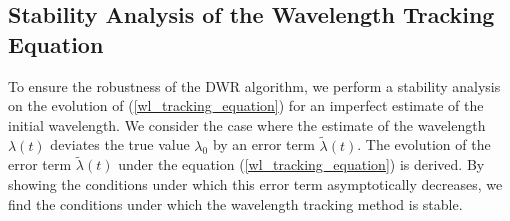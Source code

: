 \documentclass[12pt]{report}
\begin{document}
	
	\subsection{Stability Analysis of the Wavelength Tracking Equation}
	To ensure the robustness of the DWR algorithm, we perform a stability analysis on the evolution of (\ref{wl_tracking_equation}) for an imperfect estimate of the initial wavelength. We consider the case where the estimate of the wavelength $\lambda(t)$ deviates the true value $\lambda_0$ by an error term $\tilde{\lambda}(t)$. The evolution of the error term $\tilde{\lambda}(t)$ under the equation (\ref{wl_tracking_equation}) is derived. By showing the conditions under which this error term asymptotically decreases, we find the conditions under which the wavelength tracking method is stable.
	
\end{document}
